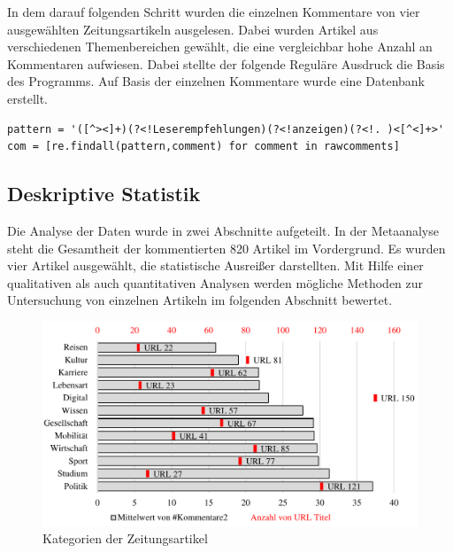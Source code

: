 \documentclass[12pt,a4paper,oneside]{article}
\begin{document}
\begin{titlepage}
\begin{flushleft}
In dem darauf folgenden Schritt wurden die einzelnen Kommentare von vier ausgewählten Zeitungsartikeln ausgelesen.  Dabei wurden Artikel aus verschiedenen Themenbereichen gewählt, die eine vergleichbar hohe Anzahl an Kommentaren aufwiesen. Dabei stellte der folgende Reguläre Ausdruck die Basis des Programms. Auf Basis der einzelnen Kommentare wurde eine Datenbank erstellt.

\begin{footnotesize}
\begin{verbatim}
pattern = '([^><]+)(?<!Leserempfehlungen)(?<!anzeigen)(?<!. )<[^<]+>'
com = [re.findall(pattern,comment) for comment in rawcomments]
\end{verbatim}
\end{footnotesize}



\subsection{Deskriptive Statistik}
Die Analyse der Daten wurde in zwei Abschnitte aufgeteilt. In der Metaanalyse steht die Gesamtheit der kommentierten 820 Artikel im Vordergrund. Es wurden vier Artikel ausgewählt, die statistische Ausreißer darstellten. Mit Hilfe einer qualitativen als auch quantitativen Analysen werden mögliche Methoden zur Untersuchung von einzelnen Artikeln im folgenden Abschnitt bewertet.


\begin{figure}[h!]
\includegraphics[width=.90\textwidth]{km_kt.pdf}
\caption{Kategorien der Zeitungsartikel}
\label{fig:kommentar-kategorie}
\end{figure}


\end{flushleft}
\end{titlepage}
\end{document}
